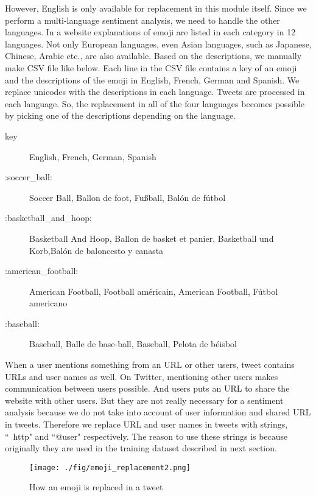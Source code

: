 However, English is only available for replacement in this module itself.
Since we perform a multi-language sentiment analysis, we need to handle the other languages.
In a website \cite{emoji_explanation} explanations of emoji are listed in each category in 12 languages. 
Not only European languages, even Asian languages, such as Japanese, Chinese, Arabic etc., are also available.
Based on the descriptions, we manually make CSV file like below.
Each line in the CSV file contains a key of an emoji and the descriptions of the emoji in English, French, German and Spanish.
We replace unicodes with the descriptions in each language.
Tweets are processed in each language.
So, the replacement in all of the four languages becomes possible by picking one of the descriptions depending on the language. 
\begin{description}
	\item[key] English, French, German, Spanish
	\item[:soccer\_ball:] Soccer Ball, Ballon de foot, Fu{\ss}ball, Bal\'on de f\'utbol
	\item[:basketball\_and\_hoop:] Basketball And Hoop, Ballon de basket et panier, Basketball und Korb,Bal\'on de baloncesto y canasta
	\item[:american\_football:] American Football, Football am\'ericain, American Football, F\'utbol americano

	\item[:baseball:]Baseball, Balle de base-ball, Baseball, Pelota de b\'eisbol
\end{description}

When a user mentions something from an URL or other users, tweet contains URLs and user names as well.
On Twitter, mentioning other users makes communication between users possible.
And users puts an URL to share the website with other users.
But they are not really necessary for a sentiment analysis because we do not take into account of user information and shared URL in tweets.
Therefore we replace URL and user names in tweets with strings, ``~http" and ``@user" respectively.
The reason to use these strings is because originally they are used in the training dataset described in next section.

\begin{figure}
	\centering
	\texttt{[image: ./fig/emoji\_replacement2.png]}
	\caption{How an emoji is replaced in a tweet}
	\label{fig:emoji_replacement}
\end{figure}


